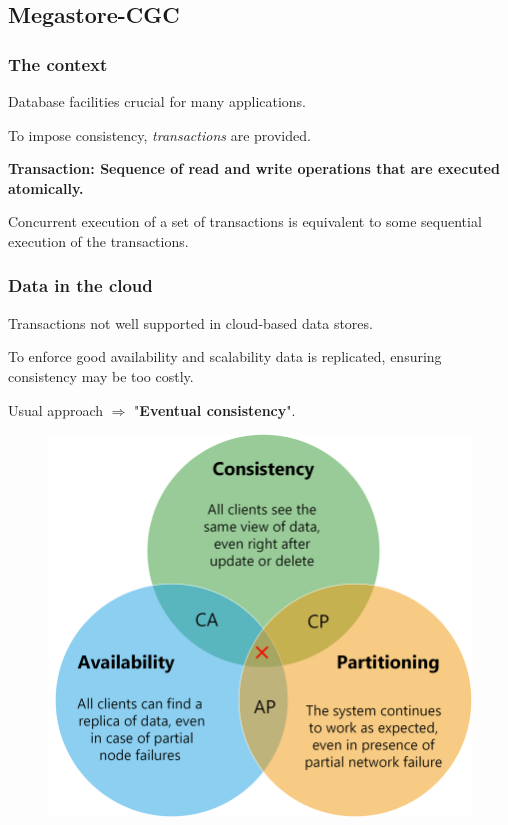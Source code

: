 \documentclass{beamer}
\begin{document}
\subsection{Megastore-CGC}
\begin{frame}
    \frametitle{The context}

    Database facilities crucial for many applications.

    \bigskip
    To impose consistency, \emph{transactions} are provided. 
    
    \bigskip
           \textbf{Transaction: Sequence of read and write operations that are executed atomically. }

    \bigskip
    Concurrent execution of a set of transactions is equivalent to some sequential execution of the transactions.
\end{frame}
\begin{frame}
    
    \frametitle{Data in the cloud}
    Transactions not well supported in cloud-based data stores.

    \bigskip
    To enforce good availability and scalability data is replicated, ensuring consistency may be too costly.

    \bigskip
    Usual approach $\Rightarrow$ "\textbf{Eventual consistency}".
\begin{figure}
    \includegraphics[width=.7\textwidth,height = .5\textheight, keepaspectratio]{img/cap.png}
\end{figure}
\end{frame}
\end{document}
